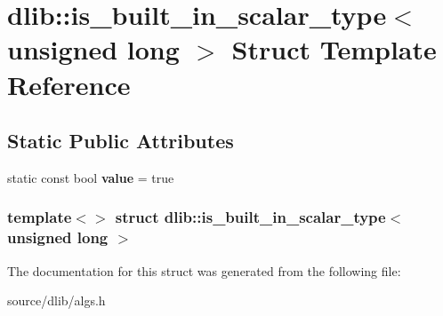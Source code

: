 \hypertarget{structdlib_1_1is__built__in__scalar__type_3_01unsigned_01long_01_4}{
\section{dlib::is\_\-built\_\-in\_\-scalar\_\-type$<$ unsigned long $>$ Struct Template Reference}
\label{structdlib_1_1is__built__in__scalar__type_3_01unsigned_01long_01_4}
}
\subsection*{Static Public Attributes}
\begin{DoxyCompactItemize}
\item 
\hypertarget{structdlib_1_1is__built__in__scalar__type_3_01unsigned_01long_01_4_a58139b9f5dcfdac9b85ba9f1e73a9149}{
static const bool {\bfseries value} = true}
\label{structdlib_1_1is__built__in__scalar__type_3_01unsigned_01long_01_4_a58139b9f5dcfdac9b85ba9f1e73a9149}

\end{DoxyCompactItemize}
\subsubsection*{template$<$$>$ struct dlib::is\_\-built\_\-in\_\-scalar\_\-type$<$ unsigned long $>$}



The documentation for this struct was generated from the following file:\begin{DoxyCompactItemize}
\item 
source/dlib/algs.h\end{DoxyCompactItemize}
